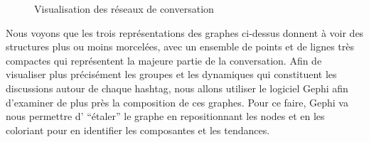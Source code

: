 \begin{figure}
    \centering
\centering



  
    \caption{Visualisation des réseaux de conversation}
\end{figure}


Nous voyons que les trois repr\'esentations des graphes ci-dessus
donnent \`a voir des structures plus ou moins morcel\'ees, avec un
ensemble de points et de lignes tr\`es compactes qui repr\'esentent la
majeure partie de la conversation. Afin de visualiser plus
pr\'ecis\'ement les groupes et les dynamiques qui constituent les
discussions autour de chaque hashtag, nous allons utiliser le logiciel
Gephi \cite{Bastian2013} afin d{\textquoteright}examiner de plus pr\`es la
composition de ces graphes. Pour ce faire, Gephi va nous permettre
d{\textquoteright} {\textquotedblleft}\'etaler{\textquotedblright} le
graphe en repositionnant les nodes et en les coloriant pour en
identifier les composantes et les tendances.

